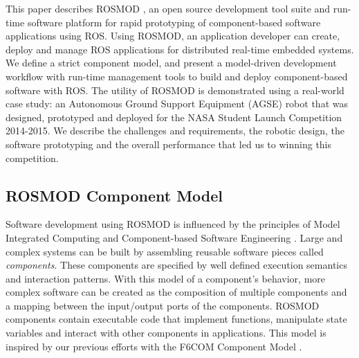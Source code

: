 This paper describes ROSMOD \cite{ROSMOD}, an open source development
tool suite and run-time software platform for rapid prototyping of
component-based software applications using ROS. Using ROSMOD, an
application developer can create, deploy and manage ROS applications
for distributed real-time embedded systems. We define a strict
component model, and present a model-driven development workflow with
run-time management tools to build and deploy component-based software
with ROS.
The utility of ROSMOD is demonstrated using a real-world case study:
an Autonomous Ground Support Equipment (AGSE) robot that was designed,
prototyped and deployed for the NASA Student Launch Competition
\cite{NASA_SL} 2014-2015. We describe the challenges and requirements,
the robotic design, the software prototyping and the overall
performance that led us to winning this competition.



\subsection{ROSMOD Component Model}

Software development using ROSMOD is influenced by the principles of
Model Integrated Computing\cite{sztipanovits1997model} and Component-based Software
Engineering \cite{CBSE}\cite{Heineman:01}. Large and complex systems
can be built by assembling reusable software pieces called
\emph{components}. These components are specified by well defined
execution semantics and interaction patterns.  With this model of a
component's behavior, more complex software can be created as the
composition of multiple components and a mapping between the
input/output ports of the components.  ROSMOD components contain
executable code that implement functions, manipulate state variables
and interact with other components in applications. This model is
inspired by our previous efforts with the F6COM Component Model
\cite{DREMS_CM}.

